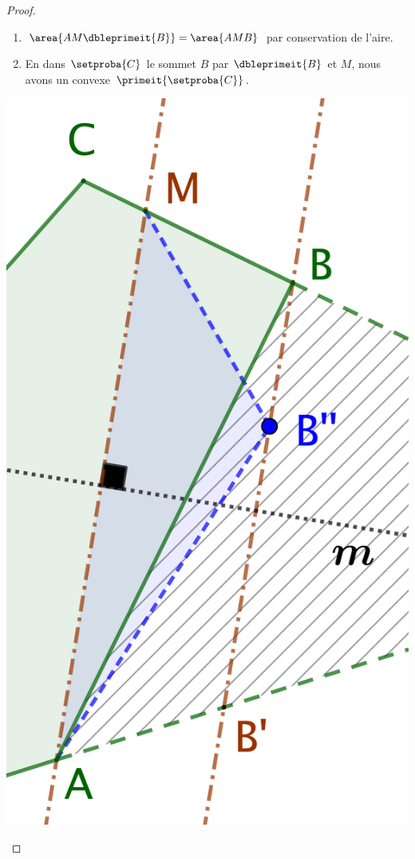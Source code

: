 \begin{proof}
\begin{itemize}
\begin{enumerate}
            \item $\area{AM \dbleprimeit{B}} = \area{AMB}$ par conservation de l'aire.

            \item En  dans $\setproba{C}$ le sommet $B$ par $\dbleprimeit{B}$ et $M$,
        nous avons un  convexe $\primeit{\setproba{C}}$.
        \end{enumerate}
        \begin{center}
            \includegraphics[scale=.4]{add-vertex-1-2.png}
        \end{center}



\end{itemize}
\end{proof}
